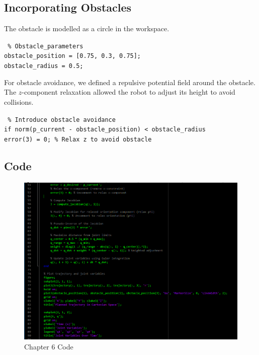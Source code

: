 \documentclass[12pt]{report}
\begin{document}
\subsection{Incorporating Obstacles}
The obstacle is modelled as a circle in the workspace.
\begin{center}
	\texttt{
		 \% Obstacle\_parameters \\obstacle\_position = [0.75, 0.3, 0.75]; %
		\\obstacle\_radius = 0.5; %
		\hspace{0.5cm} 
	}
\end{center}
For obstacle avoidance, we defined a repulsive potential field around the obstacle. The \(z\)-component relaxation allowed the robot to adjust its height to avoid collisions.

\begin{center}
	\texttt{
		\% Introduce obstacle avoidance \\
		if norm(p\_current - obstacle\_position) < obstacle\_radius \\
		\hspace{0.5cm} error(3) = 0; \% Relax z to avoid obstacle \\}
\end{center}






\subsection{Code}
\begin{figure}[H]
	\hspace{-15mm}
	\includegraphics[scale=1]{LC} %
	\caption{Chapter 6 Code}
	\label{run10} %
\end{figure}
\end{document}
